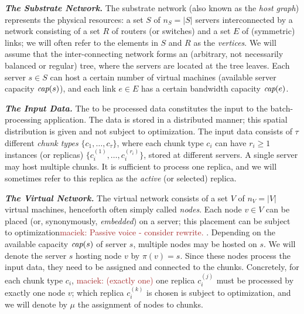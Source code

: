 \documentclass[9pt]{sigcomm-alternate}
\newcommand{\maciek}[1]{\textcolor{brown}{maciek: #1}}
\newcommand{\MaFactor}{m}
\newcommand{\ChunkType}{\tau}
\newcommand{\VirtualNodes}{\ensuremath{V}}
\newcommand{\achunk}{\ensuremath{c}}
\newcommand{\capacity}{\emph{cap}}
\begin{document}
\textbf{\emph{The Substrate Network.}} The substrate network (also known as the \emph{host graph}) represents the physical resources:
a set $S$ of $n_S=|S|$ servers interconnected by a network consisting of a set $R$ of routers (or switches)
and a set $E$ of (symmetric) links; we will often refer to the elements in $S$ and $R$
as the \emph{vertices}. We will assume that the inter-connecting network forms an (arbitrary, not necessarily balanced
or regular) tree,
where the servers are located at the tree leaves.
Each server $s\in S$ can host a certain number
of virtual machines (available server capacity $\capacity(s)$), and each link $e\in E$ has a certain bandwidth
capacity $\capacity(e)$.

\textbf{\emph{The Input Data.}} The to be processed data constitutes the input to the batch-processing application.
The data is stored in a distributed manner; this spatial distribution is given and not subject to optimization.
The input data consists of $\tau$ different \emph{chunk types} $\{\achunk_1, \ldots, \achunk_{\ChunkType}\}$,
where each chunk type $\achunk_i$ can have $r_i\geq 1$ instances (or replicas) $\{\achunk_{i}^{(1)},\ldots, \achunk_{i}^{(r_i)}\}$,
 stored at different servers. A single server may host multiple chunks.
It is sufficient to process one replica, and we will sometimes refer to this
replica as the \emph{active} (or selected) replica.

\textbf{\emph{The Virtual Network.}} The virtual network consists of a set $\VirtualNodes$ of $n_V=|\VirtualNodes|$ virtual machines,
henceforth often simply called \emph{nodes}.
Each node $v \in \VirtualNodes$ can be placed (or, synonymously, \emph{embedded}) on a server; this placement can be subject
to optimization\maciek{Passive voice - consider rewrite.}
.
Depending on the available capacity $\capacity(s)$ of server $s$, multiple nodes may be hosted on $s$.
We will denote the server $s$ hosting node $v$ by $\pi(v)=s$.
Since these nodes process the input data, they need to be assigned and connected to the
chunks. Concretely, for each chunk type $\achunk_i$, \maciek{(exactly one)} one replica $\achunk_{i}^{(j)}$ must be processed by exactly one node $v$;
which replica $\achunk_{i}^{(k)}$ is chosen is subject to optimization, and 
we will denote by $\mu$ the assignment of nodes to chunks.
\end{document}
